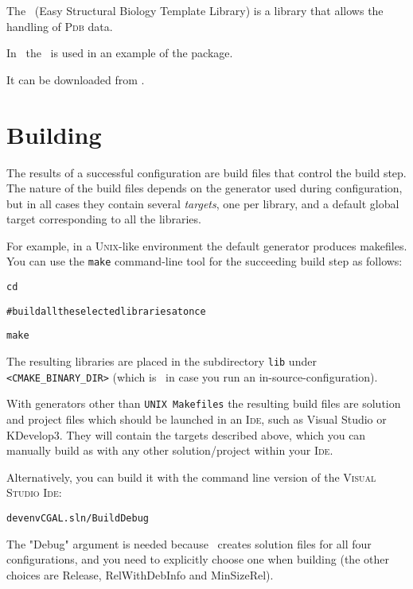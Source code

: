 The \esbtl\ (Easy Structural Biology Template Library) is a library that allows 
the handling of \textsc{Pdb} data.

In \cgal\ the  \esbtl\ is used in an example of the 
 package.

It can be downloaded from \esbtlpage.

\section{Building \cgal \label{sec:building}}

The results of a successful configuration are build files that control the build step.
The nature of the build files depends on the generator used during configuration, but in all cases they 
contain several \emph{targets}, one per library, and a default global target corresponding 
to all the libraries.

For example, in a \textsc{Unix}-like environment the default generator produces
makefiles. You can use the \texttt{make} command-line tool for the
succeeding build step as follows:

{\ccTexHtml{}{}
\begin{alltt}

cd \cgalrel

# build all the selected libraries at once

make 

\end{alltt}
}

The resulting libraries are placed in the subdirectory \texttt{lib} under \texttt{<CMAKE\_BINARY\_DIR>}
(which is \cgalrel\ in case you run an in-source-configuration).

With generators other than \texttt{UNIX Makefiles} the resulting build files
are solution and project files which
should be launched in an \textsc{Ide}, such as Visual Studio or KDevelop3. They will contain the targets described
above, which you can manually build as with any other solution/project within your \textsc{Ide}.

Alternatively, you can build it with the command line version of the
\textsc{Visual Studio Ide}:

{\ccTexHtml{}{}
\begin{alltt}

    devenv CGAL.sln /Build Debug

\end{alltt}
}

The "Debug" argument is needed because \cmake\ creates solution files for
all four configurations, and you need to explicitly choose one when building
(the other choices are Release, RelWithDebInfo and MinSizeRel).


